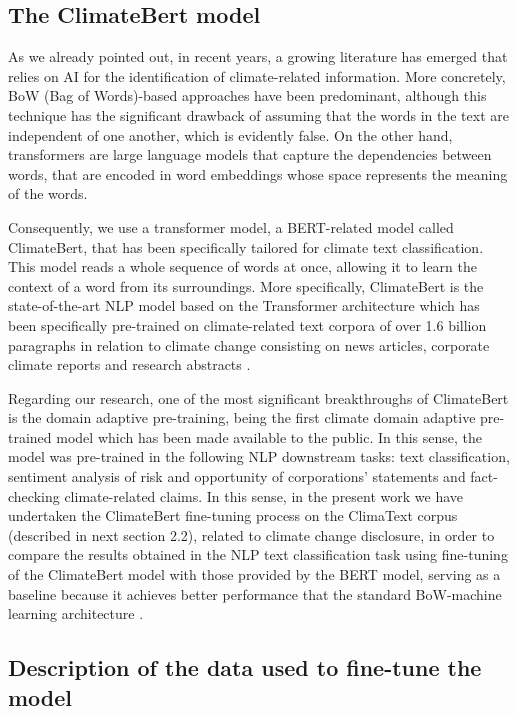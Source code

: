 \documentclass[runningheads]{llncs}
\begin{document}
\subsection{The ClimateBert model}

As we already pointed out, in recent years, a growing literature has emerged that relies on AI for the identification of climate-related information. More concretely, BoW (Bag of Words)-based approaches have been predominant, although this technique has the significant drawback of assuming that the words in the text are independent of one another, which is evidently false. On the other hand, transformers are large language models that capture the dependencies between words, that are encoded in word embeddings whose space represents the meaning of the words. 

Consequently, we use a transformer model, a BERT-related model called ClimateBert, that has been specifically tailored for climate text classification.  This model reads a whole sequence of words at once, allowing it to learn the context of a word from its surroundings. More specifically, ClimateBert is the state-of-the-art NLP model based on the Transformer architecture which has been specifically pre-trained on climate-related text corpora of over 1.6 billion paragraphs in relation to climate change consisting on news articles, corporate climate reports and research abstracts \cite{webersinke2021climatebert}. 

Regarding our research, one of the most significant breakthroughs of ClimateBert is the domain adaptive pre-training, being the first climate domain adaptive pre-trained model which has been made available to the public. In this sense, the model was pre-trained in the following NLP downstream tasks: text classification, sentiment analysis of risk and opportunity of corporations’ statements and fact-checking climate-related claims. In this sense, in the present work we have undertaken the ClimateBert fine-tuning process on the ClimaText corpus (described in next section 2.2), related to climate change disclosure, in order to compare the results obtained in the NLP text classification task using fine-tuning of the ClimateBert model with those provided by the BERT model, serving as a baseline because it achieves better performance that the standard BoW-machine learning architecture \cite{gonzalez2020comparing}. 

\subsection{Description of the data used to fine-tune the model}
\end{document}
